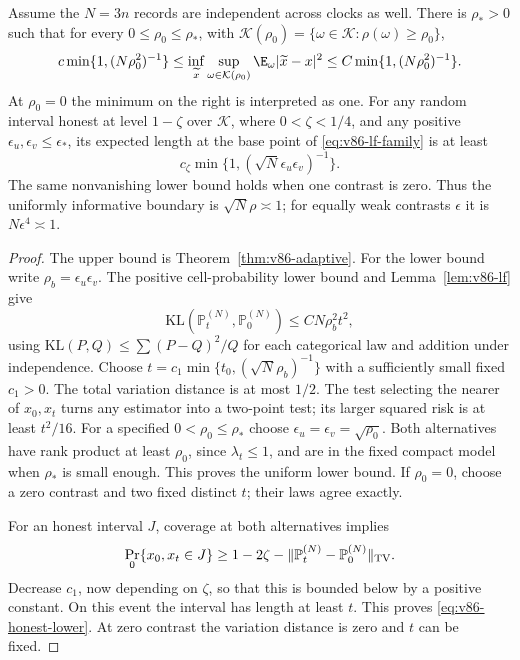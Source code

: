 \begin{theorem}
\label{thm:v86-singular-lower}
Assume the $N=3n$ records are independent across clocks as well.
There is $\rho_*>0$ such that for every $0\le\rho_0\le\rho_*$,
with $\mathcal K(\rho_0)=\{\omega\in\mathcal K:\rho(\omega)\ge\rho_0\}$,
\begin{equation}\label{eq:v86-minimax-transition}
 c\min\{1,(N\rho_0^2)^{-1}\}
 \le\inf_{\widetilde x}\sup_{\omega\in\mathcal K(\rho_0)}
                      \E_\omega|\widetilde x-x|^2
 \le C\min\{1,(N\rho_0^2)^{-1}\}.
\end{equation}
At $\rho_0=0$ the minimum on the right is interpreted as one.
For any random interval honest at level $1-\zeta$ over $\mathcal K$,
where $0<\zeta<1/4$, and any positive
$\epsilon_u,\epsilon_v\le\epsilon_*$, its expected length at the
base point of \eqref{eq:v86-lf-family} is at least
\begin{equation}\label{eq:v86-honest-lower}
 c_\zeta\min\{1,(\sqrt N\epsilon_u\epsilon_v)^{-1}\}.
\end{equation}
The same nonvanishing lower bound holds when one contrast is zero.
Thus the uniformly informative boundary is
$\sqrt N\rho\asymp1$; for equally weak contrasts $\epsilon$ it is
$N\epsilon^4\asymp1$.
\end{theorem}
\begin{proof}
The upper bound is Theorem~\ref{thm:v86-adaptive}. For the lower bound
write $\rho_b=\epsilon_u\epsilon_v$. The positive cell-probability
lower bound and Lemma~\ref{lem:v86-lf} give
\[
 \mathrm{KL}(\mathbb P_t^{(N)},\mathbb P_0^{(N)})
       \le CN\rho_b^2t^2,
\]
using $\mathrm{KL}(P,Q)\le\sum(P-Q)^2/Q$ for each categorical law
and addition under independence. Choose
$t=c_1\min\{t_0,(\sqrt N\rho_b)^{-1}\}$ with a sufficiently small
fixed $c_1>0$. The total variation distance is at most $1/2$.
The test selecting the nearer of $x_0,x_t$ turns any estimator into
a two-point test; its larger squared risk is at least $t^2/16$.
For a specified $0<\rho_0\le\rho_*$ choose
$\epsilon_u=\epsilon_v=\sqrt{\rho_0}$. Both alternatives have rank
product at least $\rho_0$, since $\lambda_t\le1$, and are in the
fixed compact model when $\rho_*$ is small enough. This proves the
uniform lower bound. If $\rho_0=0$, choose a zero contrast and two
fixed distinct $t$; their laws agree exactly.

For an honest interval $J$, coverage at both alternatives implies
\[
 \Pr_0\{x_0,x_t\in J\}
 \ge1-2\zeta-\|\mathbb P_t^{(N)}-\mathbb P_0^{(N)}\|_{\rm TV}.
\]
Decrease $c_1$, now depending on $\zeta$, so that this is bounded
below by a positive constant. On this event the interval has length
at least $t$. This proves \eqref{eq:v86-honest-lower}. At zero
contrast the variation distance is zero and $t$ can be fixed.
\end{proof}


